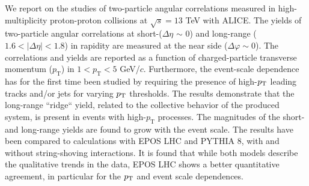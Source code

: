 We report on the studies of two-particle angular correlations measured in high-multiplicity proton-proton collisions at $\sqrt{s} =13$ TeV with ALICE. 
The yields of two-particle angular correlations at short-($\Delta\eta$ $\sim$ 0) and long-range ($1.6 < |\Delta\eta| < 1.8$) in rapidity are measured at the near side ($\Delta\varphi \sim 0$).
The correlations and yields are reported as a function of charged-particle transverse momentum ($p_{\mathrm T}$) in $1 < p_{\mathrm T} < 5$ GeV/$c$.
Furthermore, the event-scale dependence has for the first time been studied by requiring the presence of high-$p_{\rm T}$ leading tracks and/or jets for varying $p_{\rm T}$ thresholds. 
The results demonstrate that the long-range ``ridge`` yield, related to the collective behavior of the produced system, is present in events with high-$p_{\mathrm T}$ processes. The magnitudes of the short- and long-range yields are found to grow with the event scale. 
The results have been compared to calculations with EPOS LHC and PYTHIA 8, with and without string-shoving interactions. It is found that while both models describe the qualitative trends in the data, EPOS LHC shows a better quantitative agreement, in particular for the $p_{\rm T}$ and event scale dependences.
